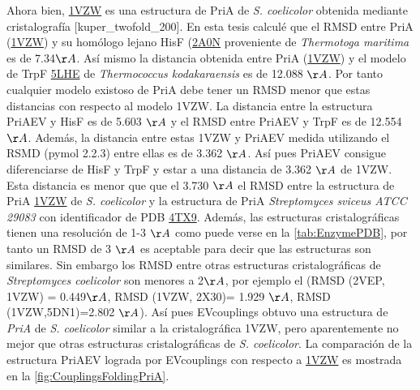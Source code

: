 \documentclass[12pt,twoside]{reedthesis}
\begin{document}
  Ahora bien, \href{https://www.rcsb.org/structure/1vzw}{1VZW} es una
  estructura de PriA de \emph{S. coelicolor} obtenida mediante
  cristalografía {[}kuper\_twofold\_200{]}. En esta tesis calculé que el
  RMSD entre PriA (\href{https://www.rcsb.org/structure/1vzw}{1VZW}) y su
  homólogo lejano HisF (\href{http://www.rcsb.org/structure/2A0N}{2A0N}
  proveniente de \emph{Thermotoga maritima} es de 7.34\({\AA}\). Así mismo
  la distancia obtenida entre PriA
  (\href{https://www.rcsb.org/structure/1vzw}{1VZW}) y el modelo de TrpF
  \href{http://www.rcsb.org/structure/5LHE}{5LHE} de \emph{Thermococcus
  kodakaraensis} es de 12.088 \({\AA}\). Por tanto cualquier modelo
  existoso de PriA debe tener un RMSD menor que estas distancias con
  respecto al modelo 1VZW. La distancia entre la estructura PriAEV y HisF
  es de 5.603 \({\AA}\) y el RMSD entre PriAEV y TrpF es de 12.554
  \({\AA}\). Además, la distancia entre estas 1VZW y PriAEV medida
  utilizando el RSMD (pymol 2.2.3) entre ellas es de 3.362 \({\AA}\). Así
  pues PriAEV consigue diferenciarse de HisF y TrpF y estar a una
  distancia de 3.362 \({\AA}\) de 1VZW. Esta distancia es menor que que el
  3.730 \({\AA}\) el RMSD entre la estructura de PriA
  \href{https://www.rcsb.org/structure/1vzw}{1VZW} de \emph{S. coelicolor}
  y la estructura de PriA \emph{Streptomyces sviceus ATCC 29083} con
  identificador de PDB \href{https://www.rcsb.org/structure/4TX9}{4TX9}.
  Además, las estructuras cristalográficas tienen una resolución de 1-3
  \({\AA}\) como puede verse en la \autoref{tab:EnzymePDB}, por tanto un
  RMSD de 3 \({\AA}\) es aceptable para decir que las estructuras son
  similares. Sin embargo los RMSD entre otras estructuras cristalográficas
  de \emph{Streptomyces coelicolor} son menores a 2\({\AA}\), por ejemplo
  el (RMSD (2VEP, 1VZW) = 0.449\({\AA}\), RMSD (1VZW, 2X30)= 1.929
  \({\AA}\), RMSD (1VZW,5DN1)=2.802 \({\AA}\)). Así pues EVcouplings
  obtuvo una estructura de \emph{PriA} de \emph{S. coelicolor} similar a
  la cristalográfica 1VZW, pero aparentemente no mejor que otras
  estructuras cristalográficas de \emph{S. coelicolor}. La comparación de
  la estructura PriAEV lograda por EVcouplings con respecto a
  \href{https://www.rcsb.org/structure/1vzw}{1VZW} es mostrada en la
  \autoref{fig:CouplingsFoldingPriA}.
  
\end{document}

